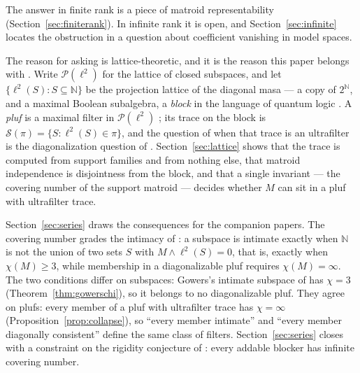 \documentclass[11pt,reqno]{amsart}
\theoremstyle{definition}
\newcommand{\N}{\mathbb{N}}
\newcommand{\cS}{\mathcal{S}}
\newcommand{\PP}{\mathcal{P}}
\newcommand{\pluf}{\pi}
\begin{document}
The answer in finite rank is a piece of matroid representability
(Section~\ref{sec:finiterank}). In infinite rank it is open, and
Section~\ref{sec:infinite} locates the obstruction in a question about
coefficient vanishing in model spaces.

The reason for asking is lattice-theoretic, and it is the reason this paper
belongs with \cite{FWI,FWII,FWIII,FWIV}. Write $\PP(\ell^2)$ for the lattice of
closed subspaces, and let $\{\ell^2(S):S\subseteq\N\}$ be the projection
lattice of the diagonal masa --- a copy of $2^{\N}$, and a maximal Boolean
subalgebra, a \emph{block} in the language of quantum logic \cite{K83}. A
\emph{pluf} is a maximal filter in $\PP(\ell^2)$ \cite{FWI}; its trace on the
block is $\cS(\pluf)=\{S:\ell^2(S)\in\pluf\}$, and the question of when that
trace is an ultrafilter is the diagonalization question of \cite{FWII}.
Section~\ref{sec:lattice} shows that the trace is computed from support
families and from nothing else, that matroid independence is disjointness from
the block, and that a single invariant --- the covering number of the support
matroid --- decides whether $M$ can sit in a pluf with ultrafilter trace.

Section~\ref{sec:series} draws the consequences for the companion papers. The
covering number grades the intimacy of \cite{FWII}: a subspace is intimate
exactly when $\N$ is not the union of two sets $S$ with $M\wedge\ell^2(S)=0$,
that is, exactly when $\chi(M)\ge3$, while membership in a diagonalizable pluf
requires $\chi(M)=\infty$. The two conditions differ on subspaces:
Gowers's intimate subspace of \cite{FWII} has $\chi=3$
(Theorem~\ref{thm:gowerschi}), so it belongs to no diagonalizable pluf. They
agree on plufs: every member of a pluf with ultrafilter trace has
$\chi=\infty$ (Proposition~\ref{prop:collapse}), so ``every member intimate''
and ``every member diagonally consistent'' define the same class of filters.
Section~\ref{sec:series} closes with a constraint on the rigidity conjecture of
\cite{FWII}: every addable blocker has infinite covering number.
\end{document}
